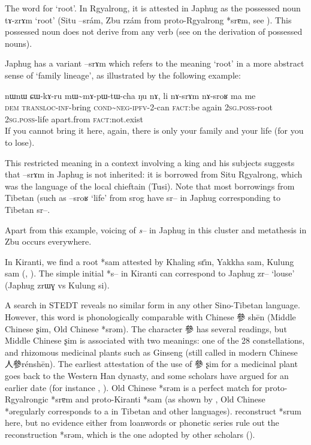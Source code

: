 \documentclass[oldfontcommands,oneside,a4paper,11pt]{article}
\newcommand{\ipa}[1]{{\phon #1}} %
\newcommand{\zh}[1]{{\cn #1}}
\begin{document}
The word for `root'. In Rgyalrong, it is attested in Japhug as the possessed noun \ipa{tɤ-zrɤm} `root' (Situ \ipa{--srám}, Zbu \ipa{rzám} from proto-Rgyalrong *\ipa{srɐm}, see \citealt[243]{jacques04these}). This possessed noun does not derive from any verb (see \citealt[3-7]{jacques14antipassive} on the derivation of possessed nouns).

Japhug has a variant \ipa{--srɤm} which refers to the meaning `root' in a more abstract sense of `family lineage', as illustrated by the following example:

\begin{exe}
\ex \label{ex:sram}
\gll
\ipa{nɯnɯ} 	\ipa{ɕɯ-kɤ-ru} 	\ipa{mɯ\textasciitilde{}mɤ-pɯ-tɯ-cha} 	\ipa{ŋu} 	\ipa{nɤ,} 	\ipa{li} 	\ipa{nɤ-srɤm} 	\ipa{nɤ-sroʁ} 	\ipa{ma} 	\ipa{me} \\
\textsc{dem} \textsc{transloc-inf}-bring \textsc{cond\textasciitilde{}neg-ipfv}-2-can \textsc{fact}:be again \textsc{2sg.poss}-root \textsc{2sg.poss}-life apart.from \textsc{fact}:not.exist\\
\glt If you cannot bring it here, again, there is only your family and your life (for you to lose).
\end{exe}

This restricted meaning in a context involving a king and his subjects suggests that \ipa{--srɤm} in Japhug is not inherited: it is borrowed from Situ Rgyalrong, which was the language of the local chieftain (Tusi). Note that most borrowings from Tibetan (such as \ipa{--sroʁ} `life' from \ipa{srog} have \ipa{sr--} in Japhug corresponding to Tibetan \ipa{sr--}.

Apart from this example, voicing of \textit{s--} in Japhug in this cluster and metathesis in Zbu occurs everywhere.

In Kiranti, we find a root *sam attested by Khaling \ipa{sɛ̄m}, Yakkha  \ipa{sam}, Kulung \ipa{sam} (\citealt{kongren07yakkha}, \citealt{tolsma06kulung}). The simple initial *s-- in Kiranti can correspond to Japhug \ipa{zr--} `louse' (Japhug \ipa{zrɯɣ} vs Kulung \ipa{si}).

A search in STEDT reveals no similar form in any other Sino-Tibetan language. However, this word is phonologically comparable with Chinese \zh{參} \ipa{shēn} (Middle Chinese \ipa{ʂim}, Old Chinese *\ipa{srəm}). The character  \zh{參} has several readings, but Middle Chinese \ipa{ʂim} is associated with two meanings: one of the 28 constellations, and rhizomous medicinal plants such as Ginseng (still called in modern Chinese \zh{人參}\ipa{rénshēn}). The earliest attestation of the use of \zh{參} \ipa{ʂim} for a medicinal plant goes back to the Western Han dynasty, and some scholars have argued for an earlier date (for instance \citealt{xu11shen}, \citealt{sun92renshen}). Old Chinese *srəm is a perfect match for proto-Rgyalrongic *\ipa{srɐm} and proto-Kiranti *\ipa{sam} (as shown by \citealt{gong95st}, Old Chinese *\ipa{ə}regularly corresponds to \ipa{a} in Tibetan and other languages). \citet{bs14oc} reconstruct *\ipa{srum} here, but no evidence either from loanwords or phonetic series rule out the reconstruction *\ipa{srəm}, which is the one adopted by other scholars (\citealt{schuessler06}).
\end{document}
